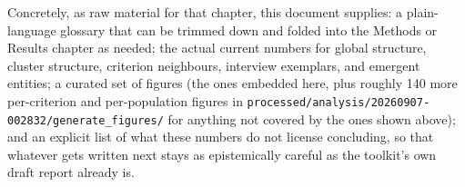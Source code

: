 \documentclass[11pt,a4paper]{article}
\begin{document}
Concretely, as raw material for that chapter, this document supplies:
a plain-language glossary that can be trimmed down and folded into the
Methods or Results chapter as needed; the actual current numbers for
global structure, cluster structure, criterion neighbours, interview
exemplars, and emergent entities; a curated set of figures (the ones
embedded here, plus roughly 140 more per-criterion and per-population
figures in \texttt{processed/analysis/20260907-002832/generate\_figures/}
for anything not covered by the ones shown above); and an explicit list
of what these numbers do not license concluding, so that whatever gets
written next stays as epistemically careful as the toolkit's own draft
report already is.
\end{document}
